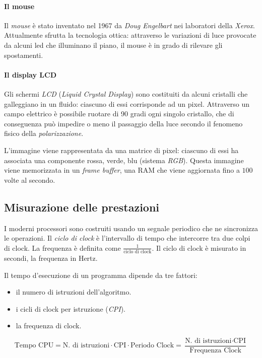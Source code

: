 \documentclass[class=book, crop=false, oneside]{standalone}
\begin{document}
\paragraph{Il mouse}
Il \emph{mouse} è stato inventato nel 1967 da \emph{Doug Engelbart} nei laboratori della \emph{Xerox}.
Attualmente sfrutta la tecnologia ottica: attraverso le variazioni di luce provocate da alcuni led che illuminano il piano, il mouse è in grado di rilevare gli spostamenti.

\paragraph{Il display LCD}
Gli schermi \emph{LCD} (\emph{Liquid Crystal Display}) sono costituiti da alcuni cristalli che galleggiano in un fluido: ciascuno di essi corrisponde ad un pixel.
Attraverso un campo elettrico è possibile ruotare di 90 gradi ogni singolo cristallo, che di conseguenza può impedire o meno il passaggio della luce secondo il fenomeno fisico della \emph{polarizzazione}.

L'immagine viene rappresentata da una matrice di pixel: ciascuno di essi ha associata una componente rossa, verde, blu (sistema \emph{RGB}).
Questa immagine viene memorizzata in un \emph{frame buffer}, una RAM che viene aggiornata fino a \(100\) volte al secondo.

\subsection{Misurazione delle prestazioni}

I moderni processori sono costruiti usando un segnale periodico che ne sincronizza le operazioni.
Il \emph{ciclo di clock} è l'intervallo di tempo che intercorre tra due colpi di clock. La frequenza è definita come \(\frac{1}{\text{ciclo di clock}}\).
Il ciclo di clock è misurato in secondi, la frequenza in Hertz.

Il tempo d'esecuzione di un programma dipende da tre fattori:
\begin{itemize}[nolistsep]
	\item il numero di istruzioni dell'algoritmo.
	\item i cicli di clock per istruzione (\emph{CPI}).
	\item la frequenza di clock.
\end{itemize}

\begin{equation*}
\text{Tempo CPU} = \text{N. di istruzioni} \cdot \text{CPI} \cdot \text{Periodo Clock} = \frac{\text{N. di istruzioni} \cdot \text{CPI}}{\text{Frequenza Clock}}
\end{equation*}
\end{document}
